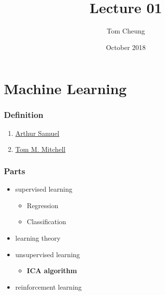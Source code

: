 \documentclass[a4paper, 12pt]{article}
\title{Lecture 01}
\author{Tom Cheung}
\date{October 2018}
\begin{document}
\maketitle
\part*{Machine Learning}
\section{Definition}
    \begin{enumerate}
        \item \href{https://ieeexplore.ieee.org/document/5392560}{Arthur Samuel}
        \item \href{http://www.cs.cmu.edu/~tom/}{Tom M. Mitchell}
    \end{enumerate}
 
\section{Parts}
    \begin{itemize}
        \item supervised learning
            \begin{itemize}
                \item Regression
                \item Classification
            \end{itemize}
        \item learning theory 
        \item unsupervised learning
            \begin{itemize}
                \item \textbf{ICA algorithm} 
            \end{itemize}
        \item reinforcement learning
    \end{itemize}
\end{document}
